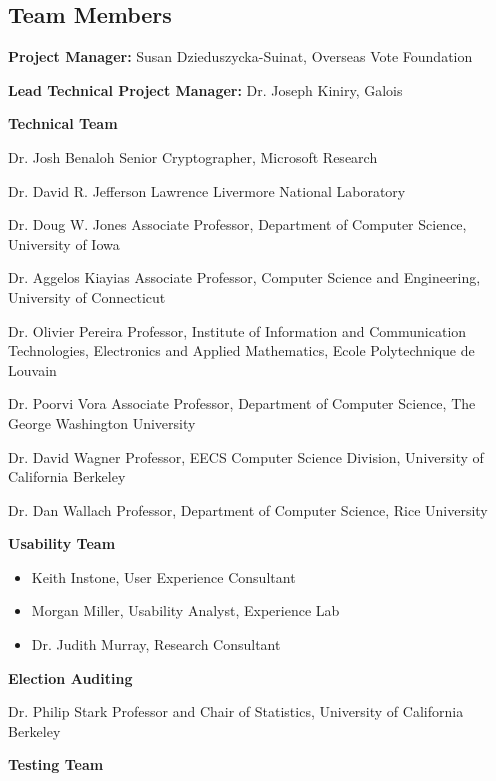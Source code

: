 \subsection{Team Members}
\label{sec:team-members}


\textbf{Project Manager:} Susan Dzieduszycka-Suinat, Overseas Vote Foundation

\textbf{Lead Technical Project Manager:} Dr. Joseph Kiniry, Galois

\textbf{Technical Team}

Dr. Josh Benaloh
Senior Cryptographer, Microsoft Research
 
Dr. David R. Jefferson
Lawrence Livermore National Laboratory
 
Dr. Doug W. Jones
Associate Professor, Department of Computer Science, University of Iowa
 
Dr. Aggelos Kiayias
Associate Professor, Computer Science and Engineering, University of Connecticut
 
Dr. Olivier Pereira
Professor, Institute of Information and Communication Technologies, Electronics and Applied Mathematics, Ecole Polytechnique de Louvain
 
Dr. Poorvi Vora
Associate Professor, Department of Computer Science, The George Washington University
 
Dr. David Wagner
Professor, EECS Computer Science Division, University of California Berkeley
 
Dr. Dan Wallach
Professor, Department of Computer Science, Rice University
 
\textbf{Usability Team}

\begin{itemize}
\item Keith Instone, User Experience Consultant
\item Morgan Miller, Usability Analyst, Experience Lab
\item Dr. Judith Murray, Research Consultant
\end{itemize}

\textbf{Election Auditing}

Dr. Philip Stark
Professor and Chair of Statistics, University of California Berkeley
 
\textbf{Testing Team}

